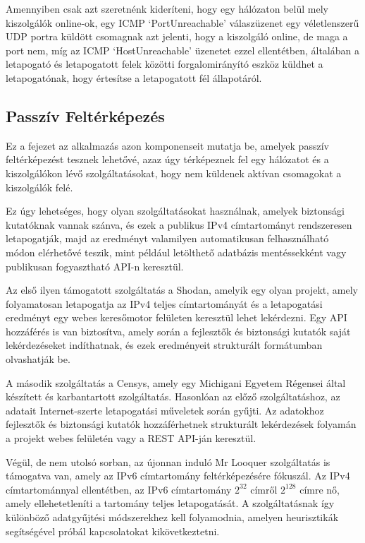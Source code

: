 	Amennyiben csak azt szeretnénk kideríteni, hogy egy hálózaton belül mely kiszolgálók online-ok, egy ICMP `PortUnreachable' válaszüzenet egy véletlenszerű UDP portra küldött csomagnak azt jelenti, hogy a kiszolgáló online, de maga a port nem, míg az ICMP `HostUnreachable' üzenetet ezzel ellentétben, általában a letapogató és letapogatott felek közötti forgalomirányító eszköz küldhet a letapogatónak, hogy értesítse a letapogatott fél állapotáról.

\subsection*{Passzív Feltérképezés}

	Ez a fejezet az alkalmazás azon komponenseit mutatja be, amelyek passzív feltérképezést tesznek lehetővé, azaz úgy térképeznek fel egy hálózatot és a kiszolgálókon lévő szolgáltatásokat, hogy nem küldenek aktívan csomagokat a kiszolgálók felé.
	
	Ez úgy lehetséges, hogy olyan szolgáltatásokat használnak, amelyek biztonsági kutatóknak vannak szánva, és ezek a publikus IPv4 címtartományt rendszeresen letapogatják, majd az eredményt valamilyen automatikusan felhasználható módon elérhetővé teszik, mint például letölthető adatbázis mentéssekként vagy publikusan fogyasztható API-n keresztül.
	
	Az első ilyen támogatott szolgáltatás a Shodan\cite{shodan16}, amelyik egy olyan projekt, amely folyamatosan letapogatja az IPv4 teljes címtartományát és a letapogatási eredményt egy webes keresőmotor felületen keresztül lehet lekérdezni. Egy API hozzáférés is van biztosítva, amely során a fejlesztők és biztonsági kutatók saját lekérdezéseket indíthatnak, és ezek eredményeit strukturált formátumban olvashatják be.
	
	A második szolgáltatás a Censys\cite{censys15}, amely egy Michigani Egyetem Régensei által készített és karbantartott szolgáltatás. Hasonlóan az előző szolgáltatáshoz, az adatait Internet-szerte letapogatási műveletek során gyűjti. Az adatokhoz fejlesztők és biztonsági kutatók hozzáférhetnek strukturált lekérdezések folyamán a projekt webes felületén vagy a REST API-ján keresztül.
	
	Végül, de nem utolsó sorban, az újonnan induló Mr Looquer\cite{looquer16} szolgáltatás is támogatva van, amely az IPv6 címtartomány feltérképezésére fókuszál. Az IPv4 címtartománnyal ellentétben, az IPv6 címtartomány $ 2^{32} $ címről $ 2^{128} $ címre nő, amely ellehetetleníti a tartomány teljes letapogatását. A szolgáltatásnak így különböző adatgyűjtési módszerekhez kell folyamodnia, amelyen heurisztikák segítségével próbál kapcsolatokat kikövetkeztetni.
	
